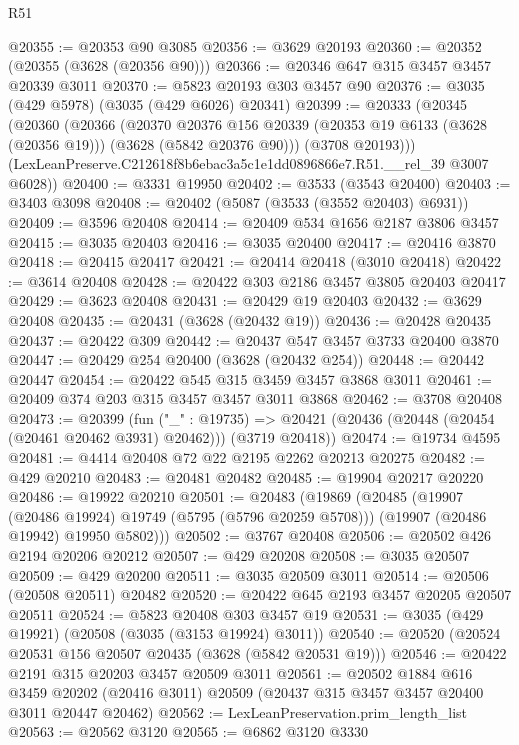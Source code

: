 \begin{lexlean}{R51}
\begin{coremodule}
@20355 := @20353 @90 @3085
@20356 := @3629 @20193
@20360 := @20352 (@20355 (@3628 (@20356 @90)))
@20366 := @20346 @647 @315 @3457 @3457 @20339 @3011
@20370 := @5823 @20193 @303 @3457 @90
@20376 := @3035 (@429 @5978) (@3035 (@429 @6026) @20341)
@20399 := @20333
    (@20345
      (@20360
        (@20366
          (@20370
            @20376
            @156
            @20339
            (@20353 @19 @6133 (@3628 (@20356 @19)))
            (@3628 (@5842 @20376 @90)))
          (@3708 @20193)))
      (LexLeanPreserve.C212618f8b6ebac3a5c1e1dd0896866e7.R51.__rel_39 @3007 @6028))
@20400 := @3331 @19950
@20402 := @3533 (@3543 @20400)
@20403 := @3403 @3098
@20408 := @20402 (@5087 (@3533 (@3552 @20403) @6931))
@20409 := @3596 @20408
@20414 := @20409 @534 @1656 @2187 @3806 @3457
@20415 := @3035 @20403
@20416 := @3035 @20400
@20417 := @20416 @3870
@20418 := @20415 @20417
@20421 := @20414 @20418 (@3010 @20418)
@20422 := @3614 @20408
@20428 := @20422 @303 @2186 @3457 @3805 @20403 @20417
@20429 := @3623 @20408
@20431 := @20429 @19 @20403
@20432 := @3629 @20408
@20435 := @20431 (@3628 (@20432 @19))
@20436 := @20428 @20435
@20437 := @20422 @309
@20442 := @20437 @547 @3457 @3733 @20400 @3870
@20447 := @20429 @254 @20400 (@3628 (@20432 @254))
@20448 := @20442 @20447
@20454 := @20422 @545 @315 @3459 @3457 @3868 @3011
@20461 := @20409 @374 @203 @315 @3457 @3457 @3011 @3868
@20462 := @3708 @20408
@20473 := @20399
    (fun ("_" : @19735) =>
    @20421 (@20436 (@20448 (@20454 (@20461 @20462 @3931) @20462))) (@3719 @20418))
@20474 := @19734 @4595
@20481 := @4414 @20408 @72 @22 @2195 @2262 @20213 @20275
@20482 := @429 @20210
@20483 := @20481 @20482
@20485 := @19904 @20217 @20220
@20486 := @19922 @20210
@20501 := @20483
    (@19869
      (@20485
        (@19907 (@20486 @19924) @19749 (@5795 (@5796 @20259 @5708)))
        (@19907 (@20486 @19942) @19950 @5802)))
@20502 := @3767 @20408
@20506 := @20502 @426 @2194 @20206 @20212
@20507 := @429 @20208
@20508 := @3035 @20507
@20509 := @429 @20200
@20511 := @3035 @20509 @3011
@20514 := @20506 (@20508 @20511) @20482
@20520 := @20422 @645 @2193 @3457 @20205 @20507 @20511
@20524 := @5823 @20408 @303 @3457 @19
@20531 := @3035 (@429 @19921) (@20508 (@3035 (@3153 @19924) @3011))
@20540 := @20520 (@20524 @20531 @156 @20507 @20435 (@3628 (@5842 @20531 @19)))
@20546 := @20422 @2191 @315 @20203 @3457 @20509 @3011
@20561 := @20502
    @1884
    @616
    @3459
    @20202
    (@20416 @3011)
    @20509
    (@20437 @315 @3457 @3457 @20400 @3011 @20447 @20462)
@20562 := LexLeanPreservation.prim_length_list
@20563 := @20562 @3120
@20565 := @6862 @3120 @3330

\end{coremodule}
\end{lexlean}
